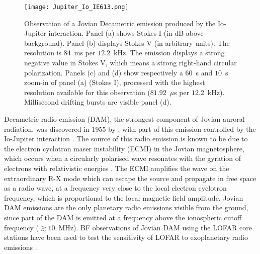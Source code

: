 \begin{figure*}
    \centering
        \texttt{[image: Jupiter\_Io\_IE613.png]}              
    \caption[Observation of a Jovian Decametric emission produced by the Io-Jupiter interaction.]{Observation of a Jovian Decametric emission produced by the Io-Jupiter interaction. Panel (a) shows Stokes I (in dB above background). Panel (b) displays Stokes V (in arbitrary units). The resolution is $84$~ms per $12.2$~kHz. The emission displays a strong negative value in Stokes V, which means a strong right-hand circular polarization. Panels (c) and (d) show respectively a $60$~s and $10$~s zoom-in of panel (a) (Stokes I), processed with the highest resolution available for this observation ($81.92$~$\mu$s per $12.2$~kHz). Millisecond drifting bursts are visible panel (d).}
    \label{fig:io-stokesI}
\end{figure*}


Decametric radio emission (DAM), the strongest component of Jovian auroral radiation, was discovered in 1955 by \cite{Burke1955}, with part of this emission controlled by the Io-Jupiter interaction \citep{Bigg1964}. The source of this radio emission is known to be due to the electron cyclotron maser instability (ECMI) in the Jovian magnetosphere, which occurs when a circularly polarised wave resonates with the gyration of electrons with relativistic energies \citep{Wu1979,Wu1985,Zarka1998, Treumann2006,Louarn2017GRL}. The ECMI amplifies the wave on the extraordinary R-X mode which can escape the source and propagate in free space as a radio wave, at a frequency very close to the local electron cyclotron frequency, which is proportional to the local magnetic field amplitude. Jovian DAM emissions are the only planetary radio emissions visible from the ground, since part of the DAM is emitted at a frequency above the ionospheric cutoff frequency ($\gtrsim 10$~MHz). BF observations of Jovian DAM using the LOFAR core stations have been used to test the sensitivity of LOFAR to exoplanetary radio emissions \citep{Turner2019, Turner2021}.

